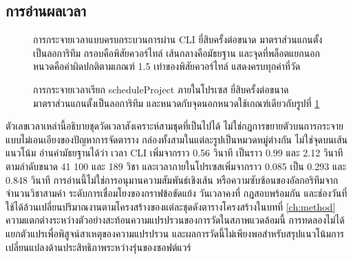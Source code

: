 \documentclass[12pt,a4paper]{article}
\begin{document}
\subsection{การอ่านผลเวลา}
\begin{figure}[tbp]\centering
{}
\caption[การกระจายเวลาผ่าน CLI]{การกระจายเวลาแบบครบกระบวนการผ่าน CLI ยี่สิบครั้งต่อขนาด มาตราส่วนแกนตั้งเป็นลอการิทึม กรอบคือพิสัยควอร์ไทล์ เส้นกลางคือมัธยฐาน และจุดที่พล็อตแยกนอกหนวดคือค่าผิดปกติตามเกณฑ์ 1.5 เท่าของพิสัยควอร์ไทล์ แสดงครบทุกค่าที่วัด}
\label{fig:boxcli}
\end{figure}
\begin{figure}[tbp]\centering
{}
\caption[การกระจายเวลาเรียก scheduleProject]{การกระจายเวลาเรียก scheduleProject ภายในโปรเซส ยี่สิบครั้งต่อขนาด มาตราส่วนแกนตั้งเป็นลอการิทึม และหนวดกับจุดนอกหนวดใช้เกณฑ์เดียวกับรูปที่ \ref{fig:boxcli}}
\label{fig:boxsched}
\end{figure}
ตัวเลขเวลาเหล่านี้อธิบายชุดวัดเวลาสังเคราะห์สามชุดที่เป็นไปได้ ไม่ใช่กฎการขยายตัวบนการกระจายแบบไม่เอนเอียงของปัญหาการจัดตาราง กล่องทั้งสามในแต่ละรูปเป็นหมวดหมู่ต่างกัน ไม่ใช่จุดบนเส้นแนวโน้ม อ่านค่ามัธยฐานได้ว่า เวลา CLI เพิ่มจากราว 0.56 วินาที เป็นราว 0.99 และ 2.12 วินาที ตามลำดับขนาด 41 100 และ 189 วิชา และเวลาภายในโปรเซสเพิ่มจากราว 0.085 เป็น 0.293 และ 0.848 วินาที การอ่านนี้ไม่ใช่การอนุมานความสัมพันธ์เชิงเส้น หรือความซับซ้อนของอัลกอริทึมจากจำนวนวิชาสามค่า ระดับการเชื่อมโยงของกราฟข้อขัดแย้ง วันเวลาคงที่ กฎสอบพร้อมกัน และช่องวันที่ใช้ได้ล้วนเปลี่ยนปริมาณงานตามโครงสร้างของแต่ละชุดดังตารางโครงสร้างในบทที่ \ref{ch:method} ความแตกต่างระหว่างตัวอย่างสะท้อนความแปรปรวนของการวัดในสภาพแวดล้อมนี้ การทดลองไม่ได้แยกตัวแปรเพื่อพิสูจน์สาเหตุของความแปรปรวน และผลการวัดนี้ไม่เพียงพอสำหรับสรุปแนวโน้มการเปลี่ยนแปลงด้านประสิทธิภาพระหว่างรุ่นของซอฟต์แวร์
\end{document}
